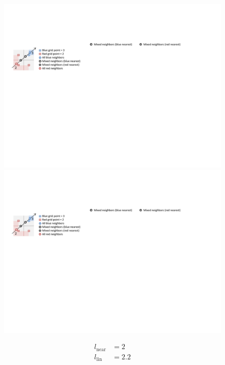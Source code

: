 \documentclass{egpubl}
\begin{document}
\begin{figure}
\centering
\begin{minipage}{0.44\linewidth}
\includegraphics[width=1.0\linewidth]{figures/Neighborhood_all}
\end{minipage}\hfill
\begin{minipage}{0.27\linewidth}
\begin{minipage}{1.0\linewidth}
\includegraphics[width=1.0\linewidth]{figures/Neighborhood_red}
\end{minipage}
\begin{minipage}{1.0\linewidth}
\begin{align}
l_\mathrm{near} &= 2\nonumber\\
l_\mathrm{lin} &= 2.2\nonumber\\

\end{align}
\end{minipage}
\end{minipage}
\end{figure}
\end{document}
